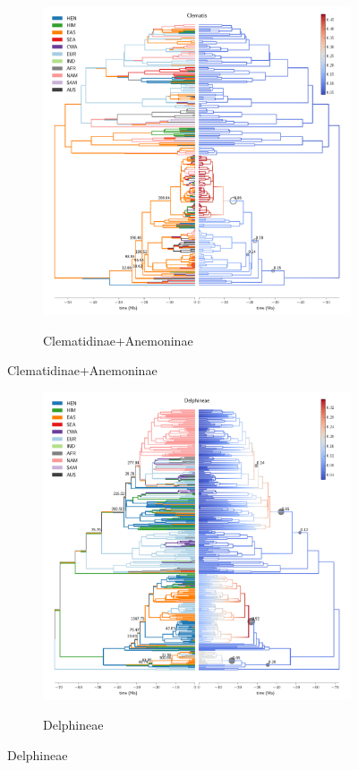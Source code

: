 \begin{figure}
  \ContinuedFloat
\begin{subfigure}{\textwidth}
\centering
\includegraphics[width=.99\linewidth]{figures/Clematis-supfig.pdf}
\label{fig:allium}
\caption{Clematidinae+Anemoninae}
\end{subfigure}
\end{figure}

\begin{figure}
  \ContinuedFloat
\begin{subfigure}{\textwidth}
\centering
\includegraphics[width=.99\linewidth]{figures/Delphineae-supfig.pdf}
\label{fig:allium}
\caption{Delphineae}
\end{subfigure}
\end{figure}

